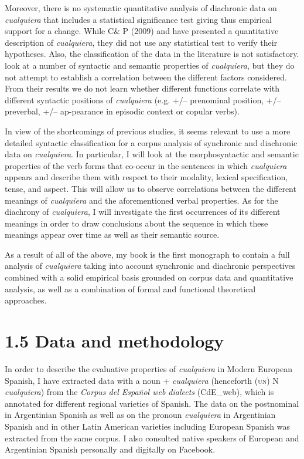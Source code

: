   Moreover, there is no systematic quantitative analysis of diachronic data on \textit{cualquiera} that includes a statistical significance test giving thus empirical support for a change. While C\& P (2009) and \citet{AloniPort2013} have presented a quantitative description of \textit{cualquiera}, they did not use any statistical test to verify their hypotheses. Also, the classification of the data in the literature is not satisfactory. \citet{AloniPort2013} look at a number of syntactic and semantic properties of \textit{cualquiera}, but they do not attempt to establish a correlation between the different factors considered. From their results we do not learn whether different functions correlate with different syntactic positions of \textit{cualquiera} (e.g. +/– prenominal position, +/– preverbal, +/– ap-pearance in episodic context or copular verbs). 

  In view of the shortcomings of previous studies, it seems relevant to use a more detailed syntactic classification for a corpus analysis of synchronic and diachronic data on \textit{cualquiera}. In particular, I will look at the morphosyntactic and semantic properties of the verb forms that co-occur in the sentences in which \textit{cualquiera} appears and describe them with respect to their modality, lexical specification, tense, and aspect. This will allow us to observe correlations between the different meanings of \textit{cualquiera} and the aforementioned verbal properties. As for the diachrony of \textit{cualquiera}, I will investigate the first occurrences of its different meanings in order to draw conclusions about the sequence in which these meanings appear over time as well as their semantic source.

  As a result of all of the above, my book is the first monograph to contain a full analysis of \textit{cualquiera} taking into account synchronic and diachronic perspectives combined with a solid empirical basis grounded on corpus data and quantitative analysis, as well as a combination of formal and functional theoretical approaches.

\section{1.5 Data and methodology}

In order to describe the evaluative properties of \textit{cualquiera} in Modern European Spanish, I have extracted data with a noun + \textit{cualquiera} (henceforth (\textsc{un)} N \textit{cualquiera}) from the \textit{Corpus del Español web dialects} (CdE\_web), which is annotated for different regional varieties of Spanish. The data on the postnominal in Argentinian Spanish as well as on the pronoun \textit{cualquiera} in Argentinian Spanish and in other Latin American varieties including European Spanish was extracted from the same corpus. I also consulted native speakers of European and Argentinian Spanish personally and digitally on Facebook.

